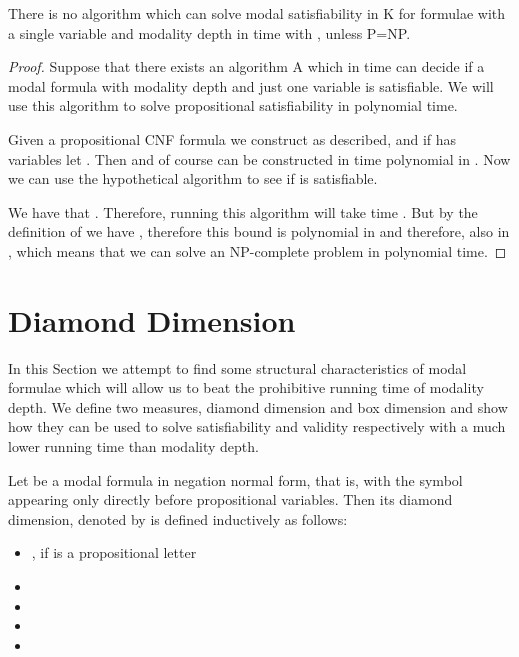 \documentclass{llncs}
\newcommand{\dd}{\ensuremath \textrm{dd}}
\begin{document}
\begin{theorem} \label{thm:lower}

There is no algorithm which can solve modal satisfiability in K for formulae
with a single variable and modality depth  in time 
with , unless P=NP.

\end{theorem}

\begin{proof}

Suppose that there exists an algorithm A which in time 
can decide if a modal formula  with modality depth  and just one
variable is satisfiable. We will use this algorithm to solve propositional
satisfiability in polynomial time.

Given a propositional CNF formula  we construct  as described,
and if  has  variables let . Then
 and of course  can be constructed in time
polynomial in . Now we can use the hypothetical algorithm to see if
 is satisfiable.

We have that . Therefore, running this algorithm will take
time .  But by
the definition of  we have , therefore this bound is
polynomial in  and therefore, also in , which means that we
can solve an NP-complete problem in polynomial time. 

\end{proof}
 
\renewcommand{\dd}{\ensuremath \mathrm{d}_\Diamond}
\newcommand{\bd}{\ensuremath \mathrm{d}_\Box}

\section{Diamond Dimension} \label{sec:dimension}

In this Section we attempt to find some structural characteristics
of modal formulae which will allow us to beat the prohibitive
running time of modality depth. We define two measures, diamond
dimension and box dimension and show how they can be used to solve
satisfiability and validity respectively with a much lower running
time than modality depth.

\begin{definition}

Let  be a modal formula in negation normal form, that is, with the 
symbol appearing only directly before propositional variables. Then its diamond
dimension, denoted by  is defined inductively as follows:

\begin{itemize}

\item , if  is a propositional letter

\item 

\item 

\item 

\item 

\end{itemize}

\end{definition}
\end{document}
